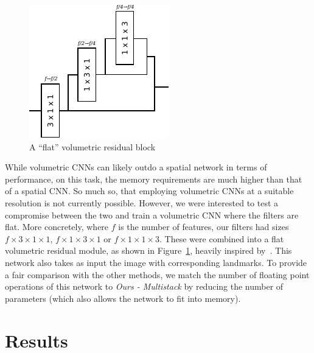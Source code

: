 \begin{figure}
  \centering
  \includegraphics[width=0.3\linewidth]{img/volumetric_residual.pdf}
  \caption{A ``flat'' volumetric residual block}
  \label{fig:flat_vol_residual}
\end{figure}

While volumetric CNNs can likely outdo a spatial network in terms of
performance, on this task, the memory requirements are much higher
than that of a spatial CNN. So much so, that employing volumetric CNNs
at a suitable resolution is not currently possible. However, we were
interested to test a compromise between the two and train a volumetric
CNN where the filters are flat. More concretely, where $f$ is the
number of features, our filters had sizes $f\times 3\times 1\times 1$,
$f\times 1\times 3\times 1$ or $f\times 1\times 1\times 3$. These were
combined into a flat volumetric residual module, as shown in
Figure~\ref{fig:flat_vol_residual}, heavily inspired
by~\cite{qiu2017learning}. This network also takes as input the image
with corresponding landmarks. To provide a fair comparison with the
other methods, we match the number of floating point operations of
this network to \textit{Ours - Multistack} by reducing the number of
parameters (which also allows the network to fit into memory).



\section{Results}

